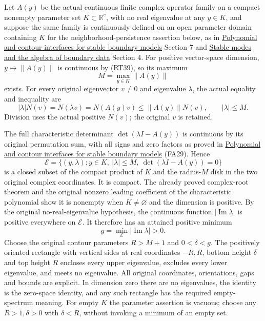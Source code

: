\documentclass[
  11pt,
]{article}
\begin{document}
Let \(A(y)\) be the actual continuous finite complex operator family on
a compact nonempty parameter set \(K\subset\mathbb R^e\), with no real
eigenvalue at any \(y\in K\), and suppose the same family is
continuously defined on an open parameter domain containing \(K\) for
the neighborhood-persistence assertion below, as in
\href{stable-prerequisite-bridges.pdf}{Polynomial and contour interfaces
for stable boundary models} Section 7 and
\href{stable-boundary-models.pdf}{Stable modes and the algebra of
boundary data} Section 4. For positive vector-space dimension,
\(y\mapsto\|A(y)\|\) is continuous by (RT39), so its maximum \[
M=\max_{y\in K}\|A(y)\|
\tag{RT40}
\] exists. For every original eigenvector \(v\ne0\) and eigenvalue
\(\lambda\), the actual equality and inequality are \[
|\lambda|N(v)=N(\lambda v)=N(A(y)v)
\le\|A(y)\|N(v),
\qquad |\lambda|\le M.
\tag{RT41}
\] Division uses the actual positive \(N(v)\); the original \(v\) is
retained.

The full characteristic determinant \(\det(\lambda I-A(y))\) is
continuous by its original permutation sum, with all signs and zero
factors as proved in \href{stable-prerequisite-bridges.pdf}{Polynomial
and contour interfaces for stable boundary models} (FA29). Hence \[
\mathcal E=\{(y,\lambda):y\in K,\ |\lambda|\le M,\
\det(\lambda I-A(y))=0\}
\tag{RT42}
\] is a closed subset of the compact product of \(K\) and the
radius-\(M\) disk in the two original complex coordinates. It is
compact. The already proved complex-root theorem and the original
nonzero leading coefficient of the characteristic polynomial show it is
nonempty when \(K\ne\varnothing\) and the dimension is positive. By the
original no-real-eigenvalue hypothesis, the continuous function
\(|\operatorname{Im}\lambda|\) is positive everywhere on \(\mathcal E\).
It therefore has an attained positive minimum \[
g=\min_{\mathcal E}|\operatorname{Im}\lambda|>0.
\tag{RT43}
\] Choose the original contour parameters \(R>M+1\) and \(0<\delta<g\).
The positively oriented rectangle with vertical sides at real
coordinates \(-R,R\), bottom height \(\delta\) and top height \(R\)
encloses every upper eigenvalue, excludes every lower eigenvalue, and
meets no eigenvalue. All original coordinates, orientations, gaps and
bounds are explicit. In dimension zero there are no eigenvalues, the
identity is the zero-space identity, and any such rectangle has the
required empty-spectrum meaning. For empty \(K\) the parameter assertion
is vacuous; choose any \(R>1,\delta>0\) with \(\delta<R\), without
invoking a minimum of an empty set.
\end{document}

